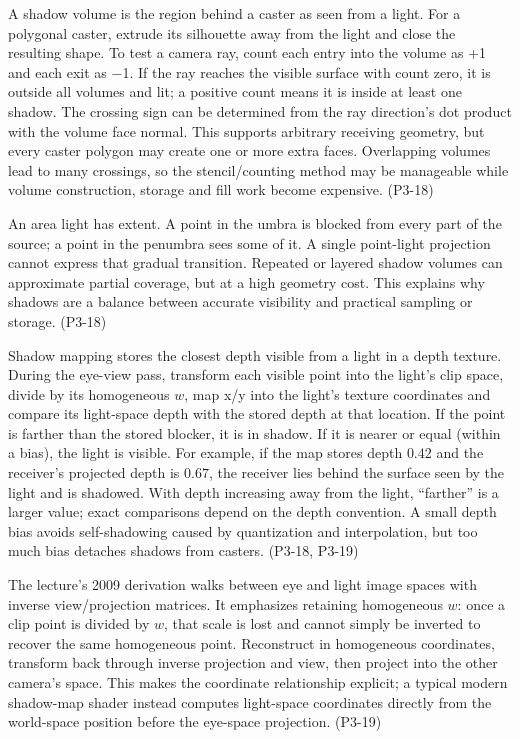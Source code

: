 A shadow volume is the region behind a caster as seen from a light. For a polygonal caster, extrude its silhouette away from the light and close the resulting shape. To test a camera ray, count each entry into the volume as +1 and each exit as −1. If the ray reaches the visible surface with count zero, it is outside all volumes and lit; a positive count means it is inside at least one shadow. The crossing sign can be determined from the ray direction's dot product with the volume face normal. This supports arbitrary receiving geometry, but every caster polygon may create one or more extra faces. Overlapping volumes lead to many crossings, so the stencil/counting method may be manageable while volume construction, storage and fill work become expensive. (P3-18)

An area light has extent. A point in the umbra is blocked from every part of the source; a point in the penumbra sees some of it. A single point-light projection cannot express that gradual transition. Repeated or layered shadow volumes can approximate partial coverage, but at a high geometry cost. This explains why shadows are a balance between accurate visibility and practical sampling or storage. (P3-18)

Shadow mapping stores the closest depth visible from a light in a depth texture. During the eye-view pass, transform each visible point into the light's clip space, divide by its homogeneous \(w\), map x/y into the light's texture coordinates and compare its light-space depth with the stored depth at that location. If the point is farther than the stored blocker, it is in shadow. If it is nearer or equal (within a bias), the light is visible. For example, if the map stores depth \(0.42\) and the receiver's projected depth is \(0.67\), the receiver lies behind the surface seen by the light and is shadowed. With depth increasing away from the light, ``farther'' is a larger value; exact comparisons depend on the depth convention. A small depth bias avoids self-shadowing caused by quantization and interpolation, but too much bias detaches shadows from casters. (P3-18, P3-19)

The lecture's 2009 derivation walks between eye and light image spaces with inverse view/projection matrices. It emphasizes retaining homogeneous \(w\): once a clip point is divided by \(w\), that scale is lost and cannot simply be inverted to recover the same homogeneous point. Reconstruct in homogeneous coordinates, transform back through inverse projection and view, then project into the other camera's space. This makes the coordinate relationship explicit; a typical modern shadow-map shader instead computes light-space coordinates directly from the world-space position before the eye-space projection. (P3-19)

